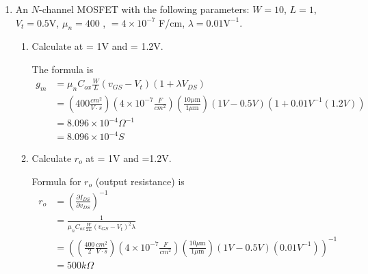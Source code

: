 \begin{enumerate}
    \item An $N$-channel MOSFET with the following parameters: $W = 10$\mun, $L = 1$\mun, $V_t  =0.5$V, $\mu_n = 400$ \mobility, \cox $=4\times10^{-7}$ F/cm\sq, $\lambda = 0.01 \mathrm{V}^{-1}$.
    
    

    \begin{enumerate}
        \item Calculate \gm at \vgs = 1V and \vds = 1.2V.
        \begin{Ans}
            The formula is 
            \begin{align*}
                g_m &= \mu_n C_{ox} \frac{W}{L} (v_{GS} - V_t)(1 + \lambda V_{DS}) \\
                &=(400 \frac{cm^2}{V \cdot s})(4 \times 10^{-7} \frac{F}{cm^2})(\frac{10 \mu \mathrm{m}}{1 \mu \mathrm{m}})(1 V - 0.5V)(1+0.01 V^{-1} (1.2 V)) \\
                &= 8.096 \times 10^{-4} \Omega^{-1} \\
                &= 8.096 \times 10^{-4} S
            \end{align*}
        \end{Ans}

        \item Calculate $r_o$ at \vgs = 1V and \vds =1.2V.
        \begin{Ans}
            Formula for $r_o$ (output resistance) is 
            \begin{align*}
                r_o &= (\frac{\partial I_{DS}}{\partial v_{DS}})^{-1} \\
                &= \frac{1}{\mu_n C_{ox} \frac{W}{2L} (v_{GS} - V_t)^2  \lambda} \\
                &= \left( (\frac{400}{2} \frac{cm^2}{V \cdot s})(4 \times 10^{-7} \frac{F}{cm^2})(\frac{10 \mu \mathrm{m}}{1 \mu \mathrm{m}})(1 V - 0.5V) (0.01 V^{-1}) \right)^{-1} \\
                &= 500 k\Omega
            \end{align*}
        \end{Ans}


\end{enumerate}
\end{enumerate}
